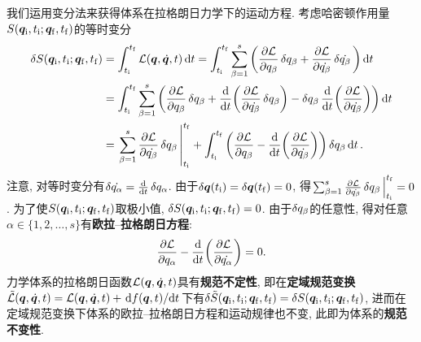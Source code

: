 我们运用变分法来获得体系在拉格朗日力学下的运动方程. 考虑哈密顿作用量$ S(\vb*{q}_{\mathrm{i}},t_{\mathrm{i}};\vb*{q}_{\mathrm{f}},t_{\mathrm{f}}) $的等时变分
\begin{align*}
    \var{\action(\vb*{q}_{\init},t_{\init};\vb*{q}_{\fini},t_{\fini})} &=\int_{t_{\init}}^{t_{\fini}} \lagr(\vb*{q},\dot{\vb*{q}},t) \dd{t} = \int_{t_{\init}}^{t_{\fini}} \sum_{\beta=1}^s\bigg(\pdv{\lagr}{q_{\beta}}\var{q_{\beta}}+\pdv{\lagr}{\dot{q_{\beta}}}\var{\dot{q_{\beta}}}\bigg) \dd{t}\\
    &=\int_{t_{\init}}^{t_{\fini}} \sum_{\beta=1}^s\bigg(\pdv{\lagr}{q_{\beta}}\var{q_{\beta}} + \dv{t}(\pdv{\lagr}{\dot{q_{\beta}}} \var{q_{\beta}}) - \var{q_{\beta}} \dv{t}(\pdv{\lagr}{\dot{q_{\beta}}})\bigg) \dd{t}\\
    &=\eval{\sum_{\beta=1}^s \pdv{\lagr}{\dot{q_{\beta}}}\var{q_{\beta}}}_{t_{\init}}^{t_{\fini}}+\int_{t_{\init}}^{t_{\fini}} \bigg(\pdv{\lagr}{q_{\beta}} - \dv{t}(\pdv{\lagr}{\dot{q_{\beta}}})\bigg) \var{q_{\beta}} \dd{t}.
\end{align*}
注意, 对等时变分有$ \var{\dot{q_{\alpha}}} = \dv{t} \var{q_{\alpha}} $. 由于$ \var{\vb*{q}(t_{\mathrm{i}})}=\var{\vb*{q}(t_{\mathrm{f}})}=0 $, 得$ \eval{\sum_{\beta=1}^s \pdv{\lagr}{\dot{q_{\beta}}}\var{q_{\beta}}}_{t_{\init}}^{t_{\fini}}=0 $. 为了使$ S(\vb*{q}_{\mathrm{i}},t_{\mathrm{i}};\vb*{q}_{\mathrm{f}},t_{\mathrm{f}}) $取极小值, $ \var{S(\vb*{q}_{\mathrm{i}},t_{\mathrm{i}};\vb*{q}_{\mathrm{f}},t_{\mathrm{f}})}=0 $. 由于$ \var{q_{\beta}} $的任意性, 得对任意$ \alpha \in \{1,2,\ldots,s\} $有\textbf{欧拉}--\textbf{拉格朗日方程}:
\begin{equation}
    \pdv{\mathcal{L}}{q_{\alpha}} - \dv{t}(\pdv{\mathcal{L}}{\dot{q_{\alpha}}}) = 0.
\end{equation}
力学体系的拉格朗日函数$ \mathcal{L}(\vb*{q},\dot{\vb*{q}},t) $具有\textbf{规范不定性}, 即在\textbf{定域规范变换}$ \tilde{\mathcal{L}}(\vb*{q},\dot{\vb*{q}},t)=\mathcal{L}(\vb*{q},\dot{\vb*{q}},t)+\dv*{f(\vb*{q},t)}{t} $下有$ \var{\tilde{S}(\vb*{q}_{\mathrm{i}},t_{\mathrm{i}};\vb*{q}_{\mathrm{f}},t_{\mathrm{f}})}=\var{S(\vb*{q}_{\mathrm{i}},t_{\mathrm{i}};\vb*{q}_{\mathrm{f}},t_{\mathrm{f}})} $, 进而在定域规范变换下体系的欧拉{--}拉格朗日方程和运动规律也不变, 此即为体系的\textbf{规范不变性}.

